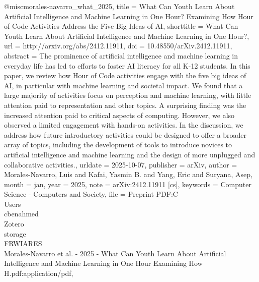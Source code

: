 @misc{morales-navarro_what_2025,
	title = {What {Can} {Youth} {Learn} {About} {Artificial} {Intelligence} and {Machine} {Learning} in {One} {Hour}? 
{Examining} {How} {Hour} of {Code} {Activities} {Address} the {Five} {Big} {Ideas} of {AI}},
	shorttitle = {What {Can} {Youth} {Learn} {About} {Artificial} {Intelligence} and {Machine} {Learning} in {One} {Hour}?},
	url = {http://arxiv.org/abs/2412.11911},
	doi = {10.48550/arXiv.2412.11911},
	abstract = {The prominence of artificial intelligence and machine learning in everyday life has led to efforts to foster 
AI literacy for all K-12 students. In this paper, we review how Hour of Code activities engage with the five big ideas of AI, in 
particular with machine learning and societal impact. We found that a large majority of activities focus on perception and 
machine learning, with little attention paid to representation and other topics. A surprising finding was the increased 
attention paid to critical aspects of computing. However, we also observed a limited engagement with hands-on activities. In the 
discussion, we address how future introductory activities could be designed to offer a broader array of topics, including the 
development of tools to introduce novices to artificial intelligence and machine learning and the design of more unplugged and 
collaborative activities.},
	urldate = {2025-10-07},
	publisher = {arXiv},
	author = {Morales-Navarro, Luis and Kafai, Yasmin B. and Yang, Eric and Suryana, Asep},
	month = jan,
	year = {2025},
	note = {arXiv:2412.11911 [cs]},
	keywords = {Computer Science - Computers and Society},
	file = {Preprint PDF:C\:\\Users\\cbenahmed\\Zotero\\storage\\FRWIARES\\Morales-Navarro et al. - 2025 - What Can Youth 
Learn About Artificial Intelligence and Machine Learning in One Hour Examining How H.pdf:application/pdf},
}

